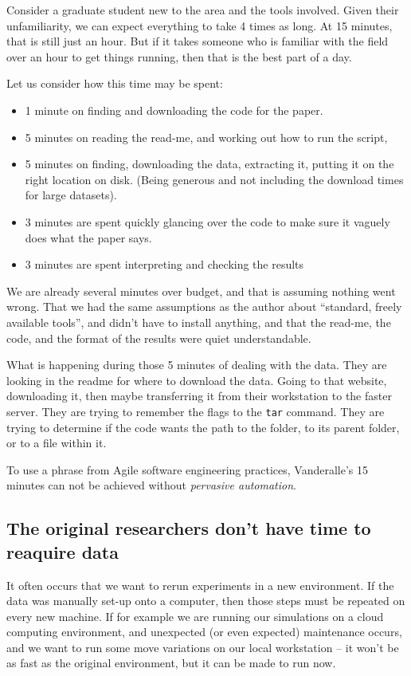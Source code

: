 \documentclass[]{article}
\begin{document}
Consider a graduate student new to the area and the tools involved.
Given their unfamiliarity, we can expect everything to take 4 times as long.
At 15 minutes, that is still just an hour.
But if it takes someone who is familiar with the field over an hour to get things running, then that is the best part of a day.


Let us consider how this time may be spent:
\begin{itemize}
	\item 1 minute on finding and downloading the code for the paper.
	\item 5 minutes on reading the read-me, and working out how to run the script,
	\item 5 minutes on finding, downloading the data, extracting it, putting it on the right location on disk. (Being generous and not including the download times for large datasets).
	\item 3 minutes are spent quickly glancing over the code to make sure it vaguely does what the paper says.
	\item 3 minutes are spent interpreting and checking the results
\end{itemize}
We are already several minutes over budget, and that is assuming nothing went wrong.
That we had the same assumptions as the author about ``standard, freely available tools'', and didn't have to install anything,
and that the read-me, the code, and the format of the results were quiet understandable.

What is happening during those 5 minutes of dealing with the data.
They are looking in the readme for where to download the data.
Going to that website, downloading it, then maybe transferring it from their workstation to the faster server.
They are trying to remember the flags to the \texttt{tar} command.
They are trying to determine if the code wants the path to the folder, to its parent folder, or to a file within it.


To use a phrase from Agile software engineering practices, Vanderalle's 15 minutes can not be achieved without \emph{pervasive automation}.

\subsection{The original researchers don't have time to reaquire data}
It often occurs that we want to rerun experiments in a new environment.
If the data was manually set-up onto a computer, then those steps must be repeated on every new machine.
If for example we are running our simulations on a cloud computing environment,
and unexpected (or even expected) maintenance occurs, and we want to run some move variations on our local workstation -- it won't be as fast as the original environment, but it can be made to run now.
\end{document}
